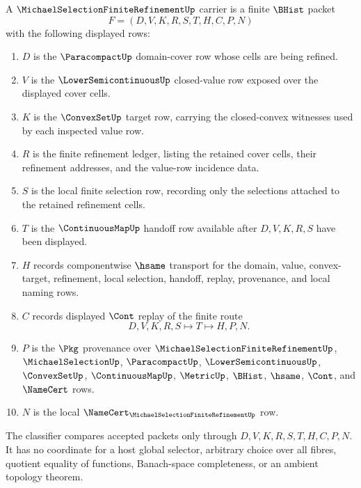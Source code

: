 \begin{definition}
\label{def:michael-selection-finite-carrier}
A $\MichaelSelectionFiniteRefinementUp$ carrier is a finite $\BHist$ packet
$$
F=(D,V,K,R,S,T,H,C,P,N)
$$
with the following displayed rows:
\begin{enumerate}
\item $D$ is the $\ParacompactUp$ domain-cover row whose cells are being refined.
\item $V$ is the $\LowerSemicontinuousUp$ closed-value row exposed over the displayed cover cells.
\item $K$ is the $\ConvexSetUp$ target row, carrying the closed-convex witnesses used by each inspected value row.
\item $R$ is the finite refinement ledger, listing the retained cover cells, their refinement addresses, and the value-row incidence data.
\item $S$ is the local finite selection row, recording only the selections attached to the retained refinement cells.
\item $T$ is the $\ContinuousMapUp$ handoff row available after $D,V,K,R,S$ have been displayed.
\item $H$ records componentwise $\hsame$ transport for the domain, value, convex-target, refinement, local selection, handoff, replay, provenance, and local naming rows.
\item $C$ records displayed $\Cont$ replay of the finite route
$$
D,V,K,R,S \longmapsto T \longmapsto H,P,N .
$$
\item $P$ is the $\Pkg$ provenance over $\MichaelSelectionFiniteRefinementUp$, $\MichaelSelectionUp$, $\ParacompactUp$, $\LowerSemicontinuousUp$, $\ConvexSetUp$, $\ContinuousMapUp$, $\MetricUp$, $\BHist$, $\hsame$, $\Cont$, and $\NameCert$ rows.
\item $N$ is the local $\NameCert_{\MichaelSelectionFiniteRefinementUp}$ row.
\end{enumerate}
The classifier compares accepted packets only through $D,V,K,R,S,T,H,C,P,N$. It has no coordinate for a host global selector, arbitrary choice over all fibres, quotient equality of functions, Banach-space completeness, or an ambient topology theorem.
\end{definition}

